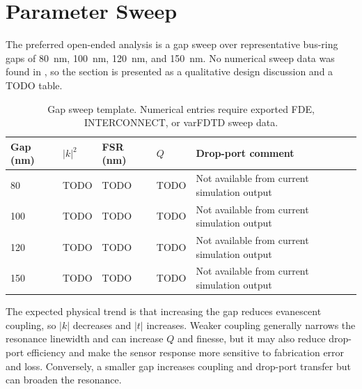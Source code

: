 \section{Parameter Sweep}
The preferred open-ended analysis is a gap sweep over representative bus-ring gaps of \SI{80}{\nano\metre}, \SI{100}{\nano\metre}, \SI{120}{\nano\metre}, and \SI{150}{\nano\metre}. No numerical sweep data was found in , so the section is presented as a qualitative design discussion and a TODO table.

\begin{table}[H]
\centering
\caption{Gap sweep template. Numerical entries require exported FDE, INTERCONNECT, or varFDTD sweep data.}
\label{tab:gap-sweep}
\begin{tabular}{lllll}
\toprule
Gap (nm) & \(|k|^2\) & FSR (nm) & \(Q\) & Drop-port comment \\
\midrule
80 & TODO & TODO & TODO & Not available from current simulation output \\
100 & TODO & TODO & TODO & Not available from current simulation output \\
120 & TODO & TODO & TODO & Not available from current simulation output \\
150 & TODO & TODO & TODO & Not available from current simulation output \\
\bottomrule
\end{tabular}
\end{table}

The expected physical trend is that increasing the gap reduces evanescent coupling, so \(|k|\) decreases and \(|t|\) increases. Weaker coupling generally narrows the resonance linewidth and can increase \(Q\) and finesse, but it may also reduce drop-port efficiency and make the sensor response more sensitive to fabrication error and loss. Conversely, a smaller gap increases coupling and drop-port transfer but can broaden the resonance.
